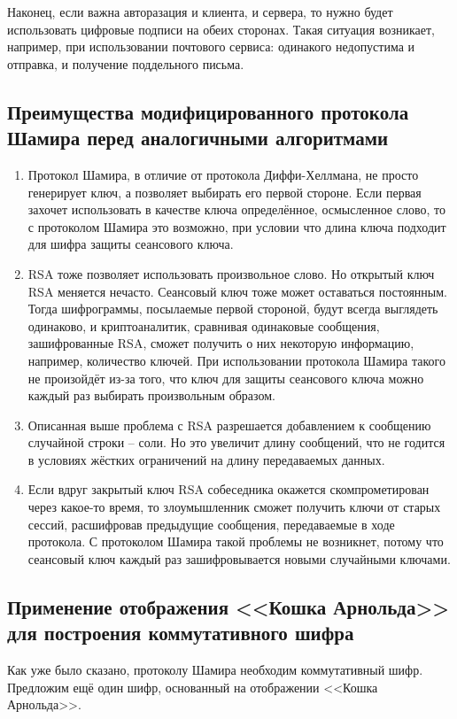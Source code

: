 Наконец, если важна авторазация и клиента, и сервера, то нужно будет использовать цифровые подписи на обеих сторонах. Такая ситуация возникает, например, при использовании почтового сервиса: одинакого недопустима и отправка, и получение поддельного письма.
\subsection{Преимущества модифицированного протокола Шамира перед аналогичными алгоритмами}
\begin{enumerate}
	\item Протокол Шамира, в отличие от протокола Диффи-Хеллмана, не просто генерирует ключ, а позволяет выбирать его первой стороне. Если первая захочет использовать в качестве ключа определённое, осмысленное слово, то с протоколом Шамира это возможно, при условии что длина ключа подходит для шифра защиты сеансового ключа.
	\item RSA тоже позволяет использовать произвольное слово. Но открытый ключ RSA меняется нечасто. Сеансовый ключ тоже может оставаться постоянным. Тогда шифрограммы, посылаемые первой стороной, будут всегда выглядеть одинаково, и криптоаналитик, сравнивая одинаковые сообщения, зашифрованные RSA, сможет получить о них некоторую информацию, например, количество ключей. При использовании протокола Шамира такого не произойдёт из-за того, что ключ для защиты сеансового ключа можно каждый раз выбирать произвольным образом.
	\item Описанная выше проблема с RSA разрешается добавлением к сообщению случайной строки – соли. Но это увеличит длину сообщений, что не годится в условиях жёстких ограничений на длину передаваемых данных.
	\item Если вдруг закрытый ключ RSA собеседника окажется скомпрометирован через какое-то время, то злоумышленник сможет получить ключи от старых сессий, расшифровав предыдущие сообщения, передаваемые в ходе протокола. С протоколом Шамира такой проблемы не возникнет, потому что сеансовый ключ каждый раз зашифровывается новыми случайными ключами.
\end{enumerate}
\subsection{Применение отображения <<Кошка Арнольда>> для построения коммутативного шифра}
Как уже было сказано, протоколу Шамира необходим коммутативный шифр. Предложим ещё один шифр, основанный на отображении <<Кошка Арнольда>>.

